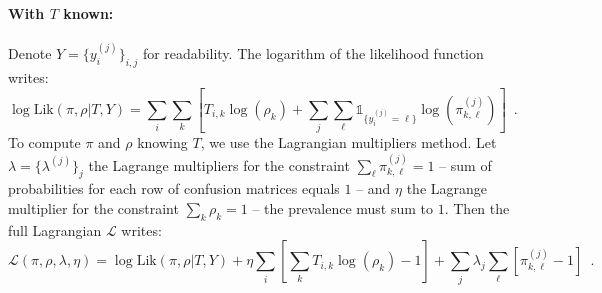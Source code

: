 \paragraph{With $T$ known: }
Denote $Y=\{y_i^{(j)}\}_{i,j}$ for readability.
The logarithm of the likelihood function writes:
\begin{equation*}
    \log \text{Lik}(\pi,\rho|T, Y) = \sum_{i} \sum_{k} \left[T_{i,k} \log (\rho_k) + \sum_j \sum_\ell \mathds{1}_{\{y_i^{(j)}=\ell\}}\log(\pi^{(j)}_{k,\ell})\right] \enspace.
\end{equation*}
To compute $\pi$ and $\rho$ knowing $T$, we use the Lagrangian multipliers method. Let $\lambda=\{\lambda^{(j)}\}_{j}$ the Lagrange multipliers for the constraint $\sum_\ell \pi_{k,\ell}^{(j)}=1$ -- sum of probabilities for each row of confusion matrices equals $1$ -- and $\eta$ the Lagrange multiplier for the constraint $\sum_k \rho_k=1$ -- the prevalence must sum to $1$. Then the full Lagrangian $\mathcal{L}$ writes:
\begin{equation*}
        \mathcal{L}(\pi,\rho,\lambda,\eta) = \log \text{Lik}(\pi,\rho|T, Y)  + \eta\sum_i \left[\sum_k T_{i,k} \log(\rho_k) - 1\right]
        + \sum_j \lambda_{j}\sum_\ell\left[\pi^{(j)}_{k,\ell} - 1\right]
        \enspace.
\end{equation*}

